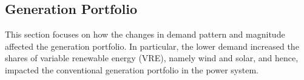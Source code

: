 \documentclass[energies,article,submit,moreauthors,pdftex]{Definitions/mdpi}
\begin{document}











\subsection{Generation Portfolio}\label{sec:Generation portfolio}
This section focuses on how the changes in demand pattern and magnitude affected the generation portfolio. In particular, the lower demand increased the shares of variable renewable energy (VRE), namely wind and solar, and hence, impacted the conventional generation portfolio in the power system. 
\end{document}
